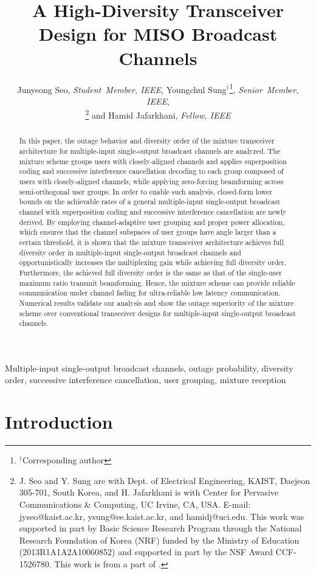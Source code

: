 \documentclass[11pt, draft, onecolumn ]{IEEEtran}
\title{\huge{A High-Diversity Transceiver Design for MISO Broadcast Channels}}
\author{
 Junyeong Seo, {\em Student~Member, IEEE}, Youngchul
Sung$^\dagger$\thanks{$^\dagger$Corresponding author}, {\em
Senior~Member, IEEE}, \\
\thanks{J. Seo and Y. Sung are with Dept. of Electrical Engineering,  KAIST, Daejeon 305-701, South
Korea, and H. Jafarkhani is with Center for Pervasive Communications \& Computing, UC Irvine, CA, USA.
E-mail: jyseo@kaist.ac.kr, ysung@ee.kaist.ac.kr, and hamidj@uci.edu.
This work was supported in part by Basic Science Research Program through the National Research Foundation of Korea (NRF) funded by the Ministry of Education (2013R1A1A2A10060852) and  supported in part by the NSF Award CCF-1526780. This work is from a part of \cite{Seo18Thesis}.}
 and Hamid Jafarkhani, {\em Fellow, IEEE}
}
\begin{document}
\maketitle



\begin{abstract}
In this paper, the outage behavior and diversity order of the mixture transceiver architecture for multiple-input single-output broadcast channels are analyzed. The mixture scheme groups users with closely-aligned channels and applies superposition coding and successive interference cancellation decoding to each group composed of users with closely-aligned channels, while applying zero-forcing beamforming across semi-orthogonal user groups. In order to enable such analysis, closed-form lower bounds on the achievable rates of a general multiple-input single-output broadcast channel with superposition coding and successive interference cancellation are newly derived. By employing channel-adaptive user grouping and proper power allocation, which ensures that the channel subspaces of user groups have angle larger than a certain threshold, it is shown that the mixture transceiver architecture achieves full diversity order in multiple-input single-output broadcast channels and opportunistically increases the multiplexing gain while achieving full diversity order. Furthermore, the achieved full diversity order is the same as that of the single-user maximum ratio transmit beamforming. Hence, the mixture scheme  can provide reliable communication under channel fading for ultra-reliable low latency communication.  Numerical results validate our analysis and show the outage superiority of the mixture scheme over conventional transceiver designs for multiple-input single-output  broadcast channels.
\end{abstract}

\begin{keywords}
Multiple-input single-output broadcast channels, outage probability, diversity order,  successive interference cancellation, user grouping, mixture reception
\end{keywords}




\section{Introduction}
\end{document}
